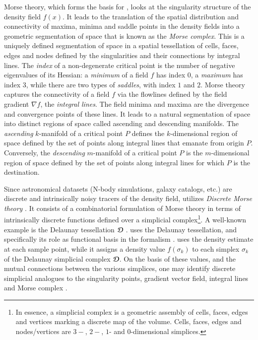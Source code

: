 Morse theory, which forms the basis for \disperse{}, looks at the singularity structure of the density field $f(x)$. It leads to 
the translation of the spatial distribution and connectivity of maxima, minima and saddle points in the density fields into a 
geometric segmentation of space that is known as the \emph{Morse complex}. This is a uniquely defined segmentation of space in a 
spatial tessellation of cells, faces, edges and nodes defined by the singularities and their connections by integral lines. 
The \emph{index} of a non-degenerate critical point is the number of negative eigenvalues of its Hessian: a \emph{minimum} of a 
field $f$ has index $0$, a \emph{maximum} has index $3$, while there are two types of \emph{saddles}, with index $1$  and $2$.  
Morse theory captures the connectivity of a field $f$ via the flowlines defined by the field gradient $\nabla f$, the \emph{integral lines}.
The field minima and maxima are the divergence and convergence points of these lines. It leads to a natural segmentation of space 
into distinct regions of space called ascending and descending manifolds. The \emph{ascending} $k$-manifold of a critical point $P$ defines 
the $k$-dimensional region of space defined by the set of points along integral lines that emanate from origin $P$. Conversely, the 
\emph{descending} $m$-manifold of a critical point $P$ is the $m$-dimensional region of space defined by the set of points along 
integral lines for which $P$ is the destination. 

Since astronomical datasets (N-body simulations, galaxy catalogs, etc.) are discrete and intrinsically noisy tracers of the density field,  \disperse{} utilizes \emph{Discrete Morse theory}  \citep[see e.g.][]{forman1998}. It consists of a combinatorial formulation of Morse theory 
in terms of intrinsically discrete functions defined over a simplicial complex\footnote{In essence, a simplicial complex 
is a geometric assembly of cells, faces, edges and vertices marking a discrete map of the volume. Cells, faces, edges and 
nodes/vertices are $3-$, $2-$, $1$- and $0$-dimensional simplices.}. A well-known example 
is the Delaunay tessellation $\cal D$ \citep{weygaert1994,okabe2000}. \disperse{} uses the Delaunay tessellation, and 
specifically its role as functional basis in the \dtfe{} formalism \citep{schaapwey2000,weyschaap2009,cautun2011}. 
\disperse{} uses the \dtfe{} density estimate at each sample point, while 
it assigns a density value $f(\sigma_k)$ to each simplex $\sigma_k$ of the Delaunay simplicial complex $\cal D$. On the basis of 
these values, and the mutual connections between the various simplices, one may identify discrete simplicial analogues to the 
singularity points, gradient vector field, integral lines and Morse complex \citep[see e.g.][for a detailed 
treatment]{gyulassy2008,sousbie2011}. 

